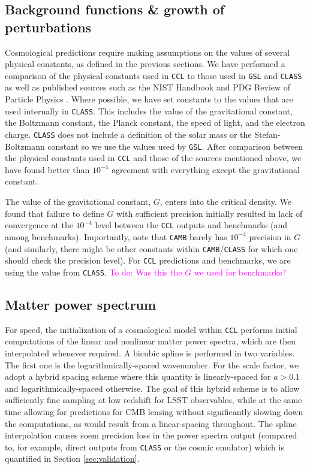 \documentclass[\docopts]{\docclass}
\newcommand{\todo}[1]{\textcolor{magenta}{To do: #1}}
\newcommand{\ccl}{{\tt CCL}\xspace}
\newcommand{\class}{{\tt CLASS}\xspace}
\newcommand{\camb}{{\tt CAMB}\xspace}
\begin{document}
\subsection{Background functions \& growth of perturbations}
\label{sec:distances}

Cosmological predictions require making assumptions on the values of several physical constants, as defined in the previous sections. We have performed a comparison of the physical constants used in \ccl to those used in {\tt GSL} and \class as well as published sources such as the NIST Handbook and PDG Review of Particle Physics \citep{Beringer:1900zz}. Where possible, we have set constants to the values that are used internally in \class. This includes the value of the gravitational constant, the Boltzmann constant, the Planck constant, the speed of light, and the electron charge. \class does not include a definition of the solar mass or the Stefan-Boltzmann constant so we use the values used by {\tt GSL}. After comparison between the physical constants used in \ccl and those of the sources mentioned above, we have found better than $10^{-4}$ agreement with everything except the gravitational constant.

The value of the gravitational constant, $G$, enters into the critical density. We found that failure to define $G$ with sufficient precision initially resulted in lack of convergence at the $10^{-4}$ level between the \ccl outputs and benchmarks (and among benchmarks). Importantly, note that \camb barely has $10^{-4}$ precision in $G$ (and similarly, there might be other constants within \camb/\class for which one should check the precision level). For \ccl predictions and benchmarks, we are using the value from \class. \todo{Was this the $G$ we used for benchmarks?} 

\subsection{Matter power spectrum}

For speed, the initialization of a cosmological model within {\tt CCL} performs initial computations of the linear and nonlinear matter power spectra, which are then interpolated whenever required. A bicubic spline is performed in two variables. The first one is the logarithmically-spaced wavenumber. For the scale factor, we adopt a hybrid spacing scheme where this quantity is linearly-spaced for $a>0.1$ and logarithmically-spaced otherwise. The goal of this hybrid scheme is to allow sufficiently fine sampling at low redshift for LSST observables, while at the same time allowing for predictions for CMB lensing without significantly slowing down the computations, as would result from a linear-spacing throughout. The spline interpolation causes soem precision loss in the power spectra output (compared to, for example, direct outputs from \class or the cosmic emulator) which is quantified in Section \ref{sec:validation}.
\end{document}

